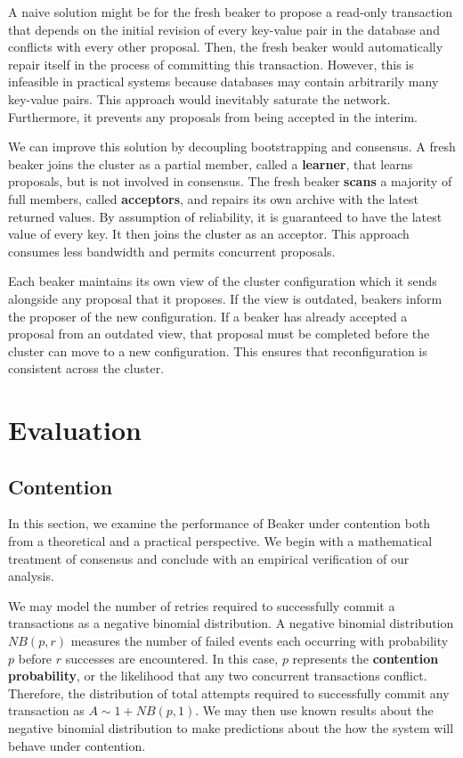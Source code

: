 \documentclass[../main.tex]{subfiles}
\begin{document}
  A naive solution might be for the fresh beaker to propose a read-only transaction that depends on
  the initial revision of every key-value pair in the database and conflicts with every other
  proposal. Then, the fresh beaker would automatically repair itself in the process of committing
  this transaction. However, this is infeasible in practical systems because databases may contain
  arbitrarily many key-value pairs. This approach would inevitably saturate the network.
  Furthermore, it prevents any proposals from being accepted in the interim.

  We can improve this solution by decoupling bootstrapping and consensus. A fresh beaker joins the
  cluster as a partial member, called a \textbf{learner}, that learns proposals, but is not involved
  in consensus. The fresh beaker \textbf{scans} a majority of full members, called
  \textbf{acceptors}, and repairs its own archive with the latest returned values. By assumption of
  reliability, it is guaranteed to have the latest value of every key. It then joins the cluster as
  an acceptor. This approach consumes less bandwidth and permits concurrent proposals.

  Each beaker maintains its own view of the cluster configuration which it sends alongside any
  proposal that it proposes. If the view is outdated, beakers inform the proposer of the new
  configuration. If a beaker has already accepted a proposal from an outdated view, that proposal
  must be completed before the cluster can move to a new configuration. This ensures that
  reconfiguration is consistent across the cluster.

\section{Evaluation}

  \subsection{Contention}
  In this section, we examine the performance of Beaker under contention both from a theoretical
  and a practical perspective. We begin with a mathematical treatment of consensus and conclude with
  an empirical verification of our analysis.

  We may model the number of retries required to successfully commit a transactions as a negative
  binomial distribution. A negative binomial distribution $NB(p, r)$ measures the number of
  failed events each occurring with probability $p$ before $r$ successes are encountered. In
  this case, $p$ represents the \textbf{contention probability}, or the likelihood that any two
  concurrent transactions conflict. Therefore, the distribution of total attempts required to
  successfully commit any transaction as $A \sim 1 + NB(p, 1)$. We may then use known results about
  the negative binomial distribution to make predictions about the how the system will behave under
  contention.
\end{document}
